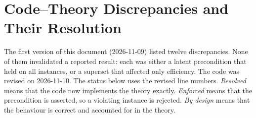 \documentclass[11pt]{article}
\theoremstyle{definition}
\theoremstyle{remark}
\begin{document}
\section{Code--Theory Discrepancies and Their Resolution}\label{app:mismatch}

The first version of this document (2026-11-09) listed twelve discrepancies. None of them
invalidated a reported result: each was either a latent precondition that held on all
instances, or a superset that affected only efficiency. The code was revised on
2026-11-10. The status below uses the revised line numbers. \emph{Resolved} means that
the code now implements the theory exactly. \emph{Enforced} means that the precondition is
asserted, so a violating instance is rejected. \emph{By design} means that the behaviour is
correct and accounted for in the theory.
\end{document}
